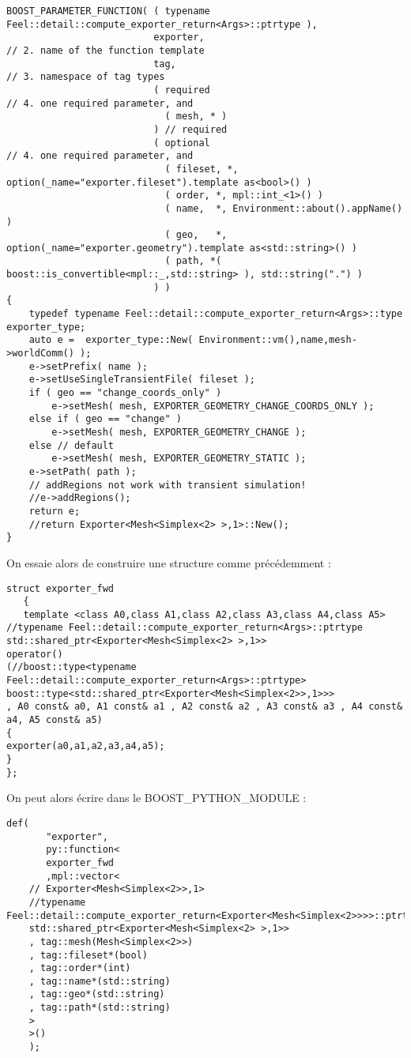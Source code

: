 \documentclass[12pt]{article}
\begin{document}
\begin{lstlisting}
BOOST_PARAMETER_FUNCTION( ( typename Feel::detail::compute_exporter_return<Args>::ptrtype ),
                          exporter,                                       // 2. name of the function template
                          tag,                                        // 3. namespace of tag types
                          ( required                                  // 4. one required parameter, and
                            ( mesh, * )
                          ) // required
                          ( optional                                  // 4. one required parameter, and
                            ( fileset, *, option(_name="exporter.fileset").template as<bool>() )
                            ( order, *, mpl::int_<1>() )
                            ( name,  *, Environment::about().appName() )
                            ( geo,   *, option(_name="exporter.geometry").template as<std::string>() )
                            ( path, *( boost::is_convertible<mpl::_,std::string> ), std::string(".") )
                          ) )
{
    typedef typename Feel::detail::compute_exporter_return<Args>::type exporter_type;
    auto e =  exporter_type::New( Environment::vm(),name,mesh->worldComm() );
    e->setPrefix( name );
    e->setUseSingleTransientFile( fileset );
    if ( geo == "change_coords_only" )
        e->setMesh( mesh, EXPORTER_GEOMETRY_CHANGE_COORDS_ONLY );
    else if ( geo == "change" )
        e->setMesh( mesh, EXPORTER_GEOMETRY_CHANGE );
    else // default
        e->setMesh( mesh, EXPORTER_GEOMETRY_STATIC );
    e->setPath( path );
    // addRegions not work with transient simulation!
    //e->addRegions();
    return e;
    //return Exporter<Mesh<Simplex<2> >,1>::New();
}
\end{lstlisting}

On  essaie alors de construire une structure comme précédemment :
\begin{lstlisting}
struct exporter_fwd
   {
   template <class A0,class A1,class A2,class A3,class A4,class A5>
//typename Feel::detail::compute_exporter_return<Args>::ptrtype
std::shared_ptr<Exporter<Mesh<Simplex<2> >,1>>
operator() 
(//boost::type<typename Feel::detail::compute_exporter_return<Args>::ptrtype>
boost::type<std::shared_ptr<Exporter<Mesh<Simplex<2>>,1>>>
, A0 const& a0, A1 const& a1 , A2 const& a2 , A3 const& a3 , A4 const& a4, A5 const& a5)
{
exporter(a0,a1,a2,a3,a4,a5);
}
};
\end{lstlisting}

On peut alors écrire dans le BOOST\_PYTHON\_MODULE :
\begin{lstlisting}
def(
       "exporter",
       py::function<
       exporter_fwd
       ,mpl::vector<
    // Exporter<Mesh<Simplex<2>>,1>
    //typename Feel::detail::compute_exporter_return<Exporter<Mesh<Simplex<2>>>>::ptrtype 
    std::shared_ptr<Exporter<Mesh<Simplex<2> >,1>> 
    , tag::mesh(Mesh<Simplex<2>>)
    , tag::fileset*(bool)
    , tag::order*(int)
    , tag::name*(std::string)
    , tag::geo*(std::string)
    , tag::path*(std::string) 
    >
    >()
    );
\end{lstlisting}
\end{document}
